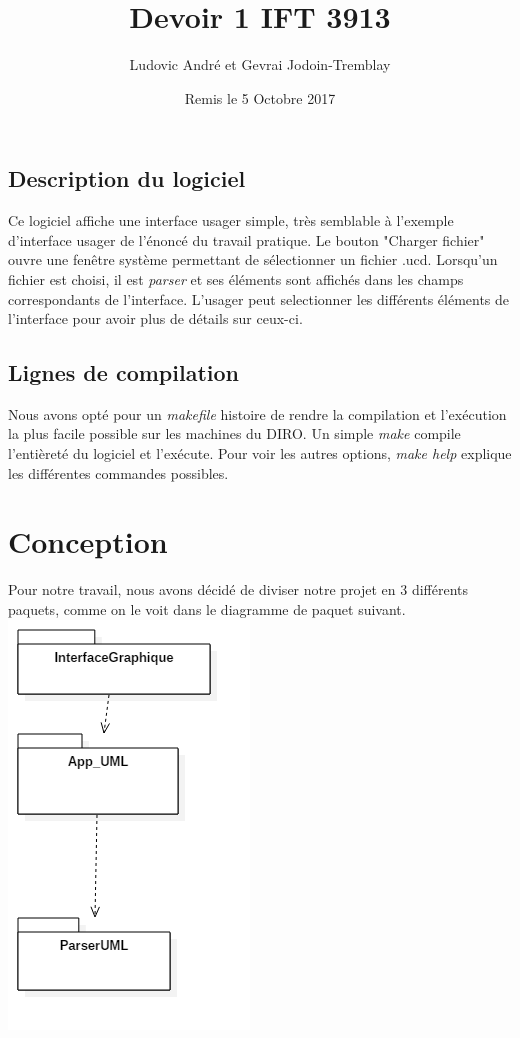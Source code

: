 \documentclass[letter,french]{report}
\begin{document}
	\title{Devoir 1 IFT 3913}
	\author{Ludovic André et Gevrai Jodoin-Tremblay}
	\date{Remis le 5 Octobre 2017}
	\maketitle
	
	
	\subsection*{Description du logiciel}
	Ce logiciel affiche une interface usager simple, très semblable
	à l'exemple d'interface usager de l'énoncé du travail pratique. Le bouton "Charger
	fichier" ouvre une fenêtre système permettant de sélectionner un fichier .ucd.
	Lorsqu'un fichier est choisi, il est \emph{parser} et ses éléments sont affichés dans
	les champs correspondants de l'interface. L'usager peut selectionner les
  différents éléments de l'interface pour avoir plus de détails sur ceux-ci.
	
	\subsection*{Lignes de compilation}
	Nous avons opté pour un \emph{makefile} histoire de rendre la compilation et l'exécution
	la plus facile possible sur les machines du DIRO. Un simple \emph{make} compile
	l'entièreté du logiciel et l'exécute. Pour voir les autres options, \emph{make help}
	explique les différentes commandes possibles.
	
	\section*{Conception}
	Pour notre travail, nous avons décidé de diviser notre projet en 3 différents
	paquets, comme on le voit dans le diagramme de paquet suivant.
	\newline 
	\includegraphics[scale=.3]{DiagrammePaquet.png}
	
\end{document}
